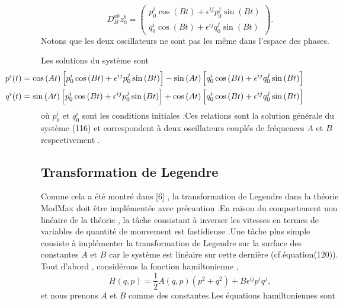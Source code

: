 \documentclass[12pt,a4paper, openany]{article}
\begin{document}
	\begin{equation}
		D^{ab}_B z_0^b=
		\begin{pmatrix}
			p_0^i \cos\left(Bt\right)+\epsilon^{ij} p_0^j \sin\left(Bt\right)\\
			q_0^i \cos\left(Bt\right)+\epsilon^{ij} q_0^j \sin\left(Bt\right)
		\end{pmatrix}.	
	\end{equation}
	Notons que les deux oscillateurs ne sont pas les m\^{e}me dans l'espace des phases.
	
	Les solutions du système sont
	 \begin{equation}
		\left.\begin{aligned}
	\hspace{-3cm}	p^i(t)&=\cos\left(At\right)\left[p_0^i\cos\left(Bt\right)+\epsilon^{ij}p_0^j\sin\left(Bt\right)\right]-\sin\left(At\right)\left[q_0^i\cos\left(Bt\right)+\epsilon^{ij}q_0^j\sin\left(Bt\right)\right]	\\	
	\hspace{-3cm}q^i(t)&=\sin\left(At\right)\left[p_0^i\cos\left(Bt\right)+\epsilon^{ij}p_0^j\sin\left(Bt\right)\right]+\cos\left(At\right)\left[q_0^i\cos\left(Bt\right)+\epsilon^{ij}q_0^j\sin\left(Bt\right)\right]
\end{aligned}\right.
	\end{equation}
	où $p_0^i$ et $q_0^i$ sont les conditions initiales .Ces relations sont la solution générale du système (116) et correspondent à deux oscillateurs couplés de fréquences $A$ et $B$ respectivement .
	\subsection{Transformation de Legendre}
	Comme cela a été montré dans [6] , la transformation de Legendre dans la théorie ModMax doit \^{e}tre implémentée avec précaution .En raison du comportement non linéaire de la théorie , la t\^{a}che consistant à inverser les vitesses en termes de variables de quantité de mouvement est fastidieuse .Une t\^{a}che plus simple consiste à implémenter la transformation de Legendre sur la surface des constantes $A$ et $B$ car le système est linéaire sur cette dernière (cf.équation(120)).\\
	Tout d'abord , considérons la fonction hamiltonienne ,
	\begin{equation}
		H(q,p)=\frac{1}{2}A(q,p)\left(p^2+q^2\right)+B\epsilon^{ij}p^iq^j ,
	\end{equation}
	et nous prenons $A$ et $B$ comme des constantes.Les équations hamiltoniennes sont 
	
\end{document}

